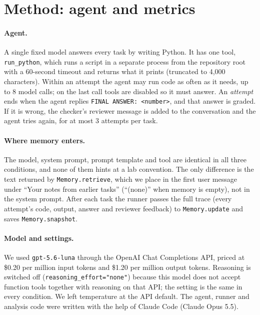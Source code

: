 
\section{Method: agent and metrics}

\paragraph{Agent.}
A single fixed model answers every task by writing Python. It has one tool,
\texttt{run\_python}, which runs a script in a separate process from the repository root
with a 60-second timeout and returns what it prints (truncated to 4{,}000 characters).
Within an attempt the agent may run code as often as it needs, up to 8 model calls; on
the last call tools are disabled so it must answer. An \emph{attempt} ends when the agent
replies \texttt{FINAL ANSWER: <number>}, and that answer is graded. If it is wrong, the
checker's reviewer message is added to the conversation and the agent tries again, for at
most 3 attempts per task.

\paragraph{Where memory enters.}
The model, system prompt, prompt template and tool are identical in all three conditions,
and none of them hints at a lab convention. The only difference is the text returned by
\texttt{Memory.retrieve}, which we place in the first user message under ``Your notes
from earlier tasks'' (``(none)'' when memory is empty), not in the system prompt. After
each task the runner passes the full trace (every attempt's code, output, answer and
reviewer feedback) to \texttt{Memory.update} and saves \texttt{Memory.snapshot}.

\paragraph{Model and settings.}
We used \texttt{gpt-5.6-luna} through the OpenAI Chat Completions API, priced at \$0.20 per
million input tokens and \$1.20 per million output tokens. Reasoning is switched off
(\texttt{reasoning\_effort="none"}) because this model does not accept function tools
together with reasoning on that API; the setting is the same in every condition. We left
temperature at the API default. The agent, runner and analysis code were written with the
help of Claude Code (Claude Opus 5.5).

